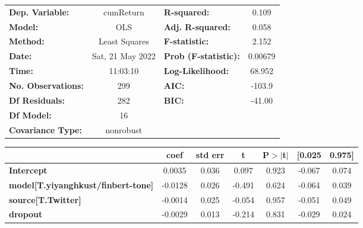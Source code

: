 \begin{center}
\begin{tabular}{lclc}
\toprule
\textbf{Dep. Variable:}                    &    cumReturn     & \textbf{  R-squared:         } &     0.109   \\
\textbf{Model:}                            &       OLS        & \textbf{  Adj. R-squared:    } &     0.058   \\
\textbf{Method:}                           &  Least Squares   & \textbf{  F-statistic:       } &     2.152   \\
\textbf{Date:}                             & Sat, 21 May 2022 & \textbf{  Prob (F-statistic):} &  0.00679    \\
\textbf{Time:}                             &     11:03:10     & \textbf{  Log-Likelihood:    } &    68.952   \\
\textbf{No. Observations:}                 &         299      & \textbf{  AIC:               } &    -103.9   \\
\textbf{Df Residuals:}                     &         282      & \textbf{  BIC:               } &    -41.00   \\
\textbf{Df Model:}                         &          16      & \textbf{                     } &             \\
\textbf{Covariance Type:}                  &    nonrobust     & \textbf{                     } &             \\
\bottomrule
\end{tabular}
\begin{tabular}{lcccccc}
                                           & \textbf{coef} & \textbf{std err} & \textbf{t} & \textbf{P$> |$t$|$} & \textbf{[0.025} & \textbf{0.975]}  \\
\midrule
\textbf{Intercept}                         &       0.0035  &        0.036     &     0.097  &         0.923        &       -0.067    &        0.074     \\
\textbf{model[T.yiyanghkust/finbert-tone]} &      -0.0128  &        0.026     &    -0.491  &         0.624        &       -0.064    &        0.039     \\
\textbf{source[T.Twitter]}                 &      -0.0014  &        0.025     &    -0.054  &         0.957        &       -0.051    &        0.049     \\
\textbf{dropout}                           &      -0.0029  &        0.013     &    -0.214  &         0.831        &       -0.029    &        0.024     \\

\end{tabular}
\end{center}
